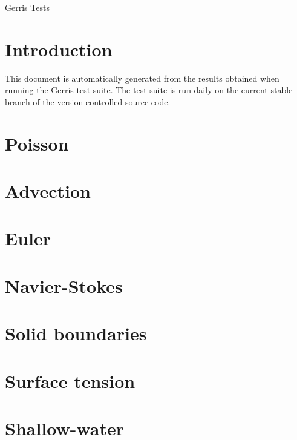 \documentclass[a4paper]{article}
\begin{document}
\mbox{}\vspace{1cm}
\begin{center}
{\Huge Gerris Tests}\\
\vspace{1cm}

\vspace{5mm}
\end{center}

\section{Introduction}

This document is automatically generated from the results obtained
when running the Gerris test suite. The test suite is run daily on the
current stable branch of the version-controlled source code.

\section{Poisson}









\section{Advection}



\section{Euler}






\section{Navier-Stokes}




\section{Solid boundaries}





\section{Surface tension}




\section{Shallow-water}







\end{document}
